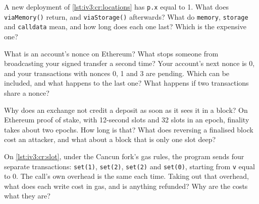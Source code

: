 \begin{question}\label{iq:iv3:smart-contracts-and-crypto-engineering:4}
A new deployment of \cref{lst:iv3:cr:locations} has \texttt{p.x} equal to 1. What does \texttt{viaMemory()} return, and \texttt{viaStorage()} afterwards? What do \texttt{memory}, \texttt{storage} and \texttt{calldata} mean, and how long does each one last? Which is the expensive one?
\label{lst:iv3:cr:locations}
\end{question}

\begin{question}\label{iq:iv3:smart-contracts-and-crypto-engineering:5}
What is an account's nonce on Ethereum? What stops someone from broadcasting your signed transfer a second time? Your account's next nonce is 0, and your transactions with nonces 0, 1 and 3 are pending. Which can be included, and what happens to the last one? What happens if two transactions share a nonce?
\end{question}

\begin{question}\label{iq:iv3:smart-contracts-and-crypto-engineering:6}
Why does an exchange not credit a deposit as soon as it sees it in a block? On Ethereum proof of stake, with 12-second slots and 32 slots in an epoch, finality takes about two epochs. How long is that? What does reversing a finalised block cost an attacker, and what about a block that is only one slot deep?
\end{question}

\begin{question}\label{iq:iv3:smart-contracts-and-crypto-engineering:7}
On \cref{lst:iv3:cr:slot}, under the Cancun fork's gas rules, the program sends four separate transactions: \texttt{set(1)}, \texttt{set(2)}, \texttt{set(2)} and \texttt{set(0)}, starting from \texttt{v} equal to 0. The call's own overhead is the same each time. Taking out that overhead, what does each write cost in gas, and is anything refunded? Why are the costs what they are?
\label{lst:iv3:cr:slot}
\end{question}

